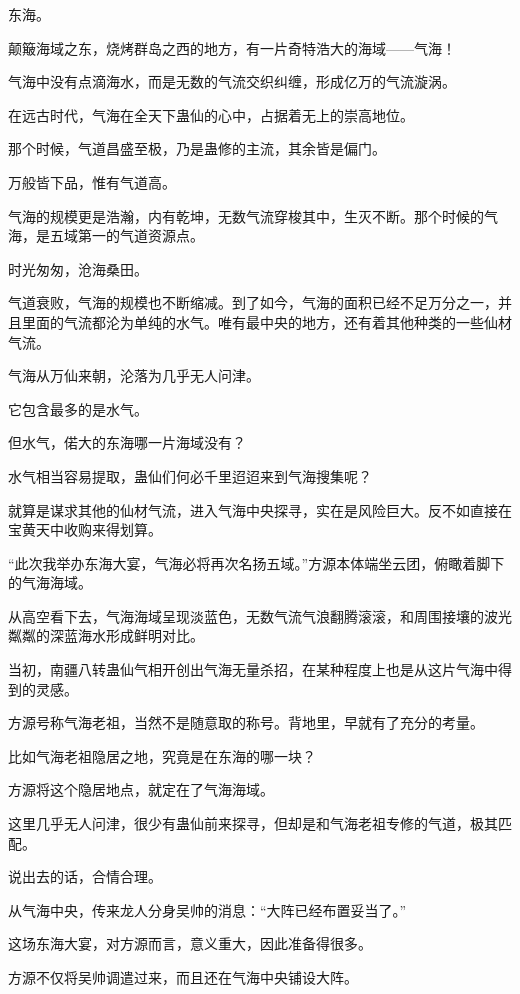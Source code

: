 
\begin{this_body}

东海。

颠簸海域之东，烧烤群岛之西的地方，有一片奇特浩大的海域——气海！

气海中没有点滴海水，而是无数的气流交织纠缠，形成亿万的气流漩涡。

在远古时代，气海在全天下蛊仙的心中，占据着无上的崇高地位。

那个时候，气道昌盛至极，乃是蛊修的主流，其余皆是偏门。

万般皆下品，惟有气道高。

气海的规模更是浩瀚，内有乾坤，无数气流穿梭其中，生灭不断。那个时候的气海，是五域第一的气道资源点。

时光匆匆，沧海桑田。

气道衰败，气海的规模也不断缩减。到了如今，气海的面积已经不足万分之一，并且里面的气流都沦为单纯的水气。唯有最中央的地方，还有着其他种类的一些仙材气流。

气海从万仙来朝，沦落为几乎无人问津。

它包含最多的是水气。

但水气，偌大的东海哪一片海域没有？

水气相当容易提取，蛊仙们何必千里迢迢来到气海搜集呢？

就算是谋求其他的仙材气流，进入气海中央探寻，实在是风险巨大。反不如直接在宝黄天中收购来得划算。

“此次我举办东海大宴，气海必将再次名扬五域。”方源本体端坐云团，俯瞰着脚下的气海海域。

从高空看下去，气海海域呈现淡蓝色，无数气流气浪翻腾滚滚，和周围接壤的波光粼粼的深蓝海水形成鲜明对比。

当初，南疆八转蛊仙气相开创出气海无量杀招，在某种程度上也是从这片气海中得到的灵感。

方源号称气海老祖，当然不是随意取的称号。背地里，早就有了充分的考量。

比如气海老祖隐居之地，究竟是在东海的哪一块？

方源将这个隐居地点，就定在了气海海域。

这里几乎无人问津，很少有蛊仙前来探寻，但却是和气海老祖专修的气道，极其匹配。

说出去的话，合情合理。

从气海中央，传来龙人分身吴帅的消息：“大阵已经布置妥当了。”

这场东海大宴，对方源而言，意义重大，因此准备得很多。

方源不仅将吴帅调遣过来，而且还在气海中央铺设大阵。


\end{this_body}
